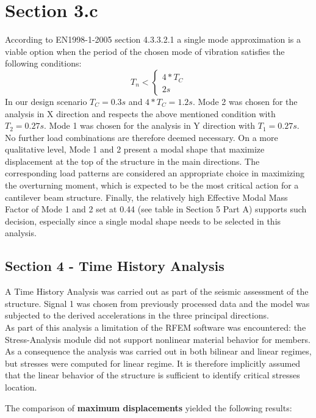 \documentclass[11pt]{article}
\begin{document}
    \section{Section 3.c}\label{section-3.c}

According to EN1998-1-2005 section 4.3.3.2.1 a single mode approximation
is a viable option when the period of the chosen mode of vibration
satisfies the following conditions: \[
T_n<
\begin{cases}
4*T_C \\
2s
\end{cases}
\] In our design scenario \(T_C=0.3s\) and \(4*T_C=1.2s\). Mode 2 was
chosen for the analysis in X direction and respects the above mentioned
condition with \(T_2=0.27 s\). Mode 1 was chosen for the analysis in Y
direction with \(T_1=0.27 s\). No further load combinations are
therefore deemed necessary. On a more qualitative level, Mode 1 and 2
present a modal shape that maximize displacement at the top of the
structure in the main directions. The corresponding load patterns are
considered an appropriate choice in maximizing the overturning moment,
which is expected to be the most critical action for a cantilever beam
structure. Finally, the relatively high Effective Modal Mass Factor of
Mode 1 and 2 set at 0.44 (see table in Section 5 Part A) supports such
decision, especially since a single modal shape needs to be selected in
this analysis.

    \subsection{Section 4 - Time History
Analysis}\label{section-4---time-history-analysis}

A Time History Analysis was carried out as part of the seismic
assessment of the structure. Signal 1 was chosen from previously
processed data and the model was subjected to the derived accelerations
in the three principal directions.\\
As part of this analysis a limitation of the RFEM software was
encountered: the Stress-Analysis module did not support nonlinear
material behavior for members. As a consequence the analysis was carried
out in both bilinear and linear regimes, but stresses were computed for
linear regime. It is therefore implicitly assumed that the linear
behavior of the structure is sufficient to identify critical stresses
location.

The comparison of \textbf{maximum displacements} yielded the following
results:
\end{document}
